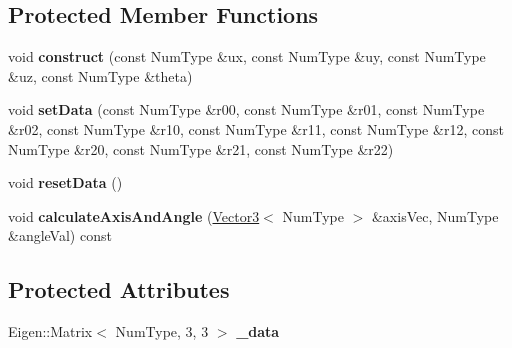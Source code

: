 \subsection*{Protected Member Functions}
\begin{DoxyCompactItemize}
\item 
\hypertarget{singletonscrews_1_1_rotation_a0b423fbb7939045af1d634ef21ad5ff0}{void {\bfseries construct} (const Num\+Type \&ux, const Num\+Type \&uy, const Num\+Type \&uz, const Num\+Type \&theta)}\label{singletonscrews_1_1_rotation_a0b423fbb7939045af1d634ef21ad5ff0}

\item 
\hypertarget{singletonscrews_1_1_rotation_aec3c58fbaa5d07e8369250d34d7e615f}{void {\bfseries set\+Data} (const Num\+Type \&r00, const Num\+Type \&r01, const Num\+Type \&r02, const Num\+Type \&r10, const Num\+Type \&r11, const Num\+Type \&r12, const Num\+Type \&r20, const Num\+Type \&r21, const Num\+Type \&r22)}\label{singletonscrews_1_1_rotation_aec3c58fbaa5d07e8369250d34d7e615f}

\item 
\hypertarget{singletonscrews_1_1_rotation_a3c940107d1d8a6f1ed2503b651584a07}{void {\bfseries reset\+Data} ()}\label{singletonscrews_1_1_rotation_a3c940107d1d8a6f1ed2503b651584a07}

\item 
\hypertarget{singletonscrews_1_1_rotation_a77ac71da2f8612ab261535c500336ba4}{void {\bfseries calculate\+Axis\+And\+Angle} (\hyperlink{singletonscrews_1_1_translation}{Vector3}$<$ Num\+Type $>$ \&axis\+Vec, Num\+Type \&angle\+Val) const }\label{singletonscrews_1_1_rotation_a77ac71da2f8612ab261535c500336ba4}

\end{DoxyCompactItemize}
\subsection*{Protected Attributes}
\begin{DoxyCompactItemize}
\item 
\hypertarget{singletonscrews_1_1_rotation_af6a71a520e4124440a02f67d343a57fb}{Eigen\+::\+Matrix$<$ Num\+Type, 3, 3 $>$ {\bfseries \+\_\+data}}\label{singletonscrews_1_1_rotation_af6a71a520e4124440a02f67d343a57fb}

\end{DoxyCompactItemize}
